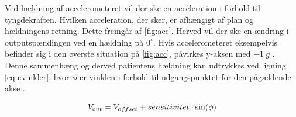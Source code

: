 \noindent
Ved hældning af accelerometeret vil der ske en acceleration i forhold til tyngdekraften. Hvilken acceleration, der sker, er afhængigt af plan og hældningens retning. Dette fremgår af \autoref{fig:acc}. Herved vil der ske en ændring i outputspændingen ved en hældning på $0^{\circ}$. Hvis accelerometeret eksempelvis befinder sig i den øverste situation på \autoref{fig:acc}, påvirkes y-aksen med $-1~g$ \citep{clifford2005}. Denne sammenhæng og derved patientens hældning kan udtrykkes ved ligning \autoref{equ:vinkler}, hvor $\phi$ er vinklen i forhold til udgangspunktet for den pågældende akse \citep{clifford2005}.

\begin{equation} \label{equ:vinkler}
	V_{out} = V_{offset} + sensitivitet \cdot \sin(\phi) \\
\end{equation}

\noindent
